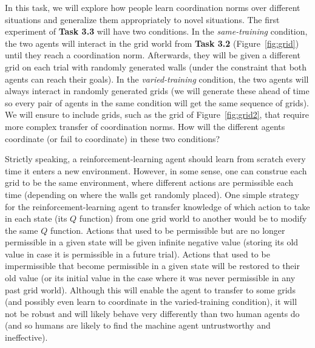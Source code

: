 \documentclass[12pt]{article}
\begin{document}
In this task, we will explore how people learn coordination norms over
different situations and generalize them appropriately to novel
situations. The first experiment of {\bf Task 3.3} will have two
conditions. In the {\em same-training} condition, the two agents will
interact in the grid world from {\bf Task 3.2} (Figure~\ref{fig:grid})
until they reach a coordination norm. Afterwards, they will be given a
different grid on each trial with randomly generated walls (under the
constraint that both agents can reach their goals). In the {\em
  varied-training} condition, the two agents will always interact in
randomly generated grids (we will generate these ahead of time so
every pair of agents in the same condition will get the same sequence
of grids). We will ensure to include grids, such as the grid of
Figure~\ref{fig:grid2}, that require more complex transfer of
coordination norms. How will the different agents coordinate (or fail
to coordinate) in these two conditions?

Strictly speaking, a reinforcement-learning agent should learn from
scratch every time it enters a new environment. However, in some
sense, one can construe each grid to be the same environment, where
different actions are permissible each time (depending on where the
walls get randomly placed). One simple strategy for the
reinforcement-learning agent to transfer knowledge of which action to
take in each state (its $Q$ function) from one grid world to another
would be to modify the same $Q$ function. Actions that used to be
permissible but are no longer permissible in a given state will be
given infinite negative value (storing its old value in case it is
permissible in a future trial). Actions that used to be impermissible
that become permissible in a given state will be restored to their old
value (or its initial value in the case where it was never permissible
in any past grid world). Although this will enable the agent to
transfer to some grids (and possibly even learn to coordinate in the
varied-training condition), it will not be robust and will likely
behave very differently than two human agents do (and so humans are
likely to find the machine agent untrustworthy and ineffective).
\end{document}
